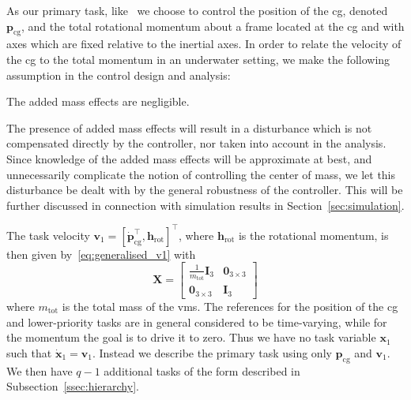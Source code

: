 \documentclass[../main.tex]{subfiles}
\begin{document}

As our primary task, like~\cite{Giordano2018} we choose to control the position of the \gls{cg}, denoted $\bm{p}_{\textrm{cg}}$, and the total rotational momentum about a frame located at the \gls{cg} and with axes which are fixed relative to the inertial axes. In order to relate the velocity of the \gls{cg} to the total momentum in an underwater setting, we make the following assumption in the control design and analysis:
\begin{assumption}\label{ass:added_mass}
    The added mass effects are negligible.
\end{assumption}
\begin{remark}
    The presence of added mass effects will result in a disturbance which is not compensated directly by the controller, nor taken into account in the analysis. Since knowledge of the added mass effects will be approximate at best, and unnecessarily complicate the notion of controlling the center of mass, we let this disturbance be dealt with by the general robustness of the controller. This will be further discussed in connection with simulation results in Section~\ref{sec:simulation}.
\end{remark}\vspace{-5pt}
%
The task velocity $\bm{v}_1 = \left[\dot{\bm{p}}_{\textrm{cg}}^\top, \bm{h}_{\textrm{rot}} \right]^\top$, where $\bm{h}_{\textrm{rot}}$ is the rotational momentum, is then given by~\eqref{eq:generalised_v1} with
\begin{equation}
    \bm{X} = \left[ \begin{smallmatrix} \frac{1}{m_{\textrm{tot}}} \bm{I}_3 & \bm{0}_{3 \times 3} \\ \bm{0}_{3 \times 3} & \bm{I}_3      
    \end{smallmatrix} \right]
\end{equation}
where $m_{\textrm{tot}}$ is the total mass of the \gls{vms}. The references for the position of the \gls{cg} and lower-priority tasks are in general considered to be time-varying, while for the momentum the goal is to drive it to zero. Thus we have no task variable $\bm{x}_1$ such that $\dot{\bm{x}}_1 = \bm{v}_1$. Instead we describe the primary task using only $\bm{p}_{\textrm{cg}}$ and $\bm{v}_1$. We then have $q-1$ additional tasks of the form described in Subsection~\ref{ssec:hierarchy}.
\end{document}
